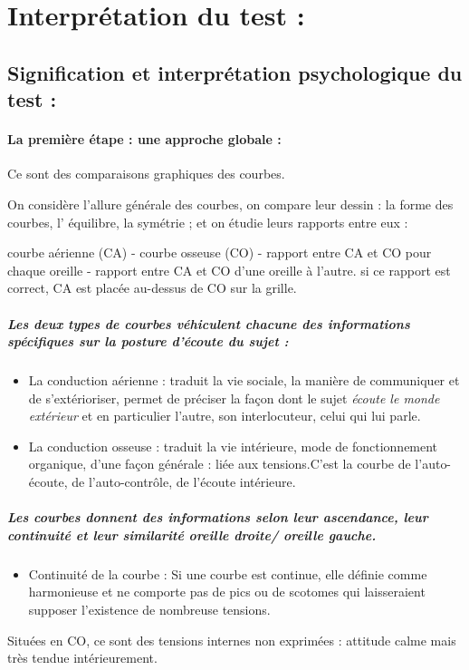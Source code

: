 \documentclass[12pt,french]{report}
\begin{document}
\section{Interprétation du test : }

\subsection{Signification et interprétation psychologique du test : }

\paragraph{La première étape : une approche globale : }

Ce sont des comparaisons graphiques des courbes. 

On considère l'allure générale des courbes, on compare leur dessin
: la forme des courbes, l' équilibre, la symétrie ; et on étudie leurs
rapports entre eux : 

courbe aérienne (CA) - courbe osseuse (CO) - rapport entre CA et CO
pour chaque oreille - rapport entre CA et CO d\textquoteright une
oreille à l'autre. si ce rapport est correct, CA est placée au-dessus
de CO sur la grille.

\subparagraph{Les deux types de courbes véhiculent chacune des informations spécifiques
sur la posture d'écoute du sujet : }
\begin{itemize}
\item La conduction aérienne : traduit la vie sociale, la manière de communiquer
et de s'extérioriser, permet de préciser la façon dont le sujet\emph{
écoute le monde extérieur} et en particulier l\textquoteright autre,
son interlocuteur, celui qui lui parle. 
\item La conduction osseuse : traduit la vie intérieure, mode de fonctionnement
organique, d'une façon générale : liée aux tensions.C'est la courbe
de l\textquoteright auto-écoute, de l\textquoteright auto-contrôle,
de l'écoute intérieure.
\end{itemize}

\subparagraph{Les courbes donnent des informations selon leur ascendance, leur
continuité et leur similarité oreille droite/ oreille gauche.}
\begin{itemize}
\item Continuité de la courbe : Si une courbe est continue, elle définie
comme harmonieuse et ne comporte pas de pics ou de scotomes qui laisseraient
supposer l'existence de nombreuse tensions.
\end{itemize}
Situées en CO, ce sont des tensions internes non exprimées : attitude
calme mais très tendue intérieurement.
\end{document}

